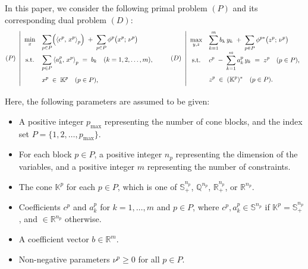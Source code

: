 \documentclass{scrartcl}
\newcommand{\inprod}[2]{\left\langle #1, \, #2 \right\rangle}
\begin{document}
In this paper, we consider the following primal problem \((P)\) and its corresponding dual problem \((D)\):
\begin{equation*}
    \everymath{\displaystyle}
    \renewcommand{\arraystretch}{2.0}
    (P)~
    \left|
    \begin{array}{cl}
         \min_{x} & \displaystyle 
             \sum_{p \in P} \Bigl(\inprod{c^p}{x^p}_p\Bigr) 
             \;+\;\sum_{p \in P} \phi^p\bigl(x^p;\,\nu^p\bigr) \\[3pt]
         \text{s.t.} 
         & \displaystyle 
             \sum_{p \in P} \inprod{a^p_{k}}{x^p}_p 
             \;=\; b_k \quad (k= 1,2,\ldots,m), \\[3pt]
         & x^p \;\in\; \mathbb{K}^p \quad (p\in P),
    \end{array}
    \right.
    \qquad
    (D)~
    \left|
    \begin{array}{cl}
         \max_{y,z} & \displaystyle 
            \sum_{k=1}^m b_k\, y_k 
            \;+\;\sum_{p \in P} \phi^{p*}\bigl(z^p;\,\nu^p\bigr) \\[3pt]
         \text{s.t.} 
         & \displaystyle 
            c^p \;-\; \sum_{k=1}^m a^p_k\,y_k \;=\; z^p \quad (p\in P), \\[3pt]
         & z^p \;\in\; (\mathbb{K}^p)^* \quad (p\in P).
    \end{array}
    \right.
\end{equation*}

Here, the following parameters are assumed to be given:
\begin{itemize}
    \item A positive integer $p_{\max}$ representing the number of cone blocks, and the index set $P = \{1, 2, \ldots, p_{\max}\}$.
    \item For each block $p \in P$, a positive integer $n_p$ representing the dimension of the variables, and a positive integer $m$ representing the number of constraints.
    \item The cone $\mathbb{K}^p$ for each $p \in P$, which is one of $\mathbb{S}^{n_p}_+$, $\mathbb{Q}^{n_p}$, $\mathbb{R}^{n_p}_+$, or $\mathbb{R}^{n_p}$.
    \item Coefficients $c^p$ and $a^p_k$ for $k = 1, \ldots, m$ and $p \in P$, where $c^p, a^p_k \in \mathbb{S}^{n_p}$ if $\mathbb{K}^p = \mathbb{S}^{n_p}_+$, and $\in \mathbb{R}^{n_p}$ otherwise.
    \item A coefficient vector $b \in \mathbb{R}^m$.
    \item Non-negative parameters $\nu^p \ge 0$ for all $p \in P$.
\end{itemize}
\end{document}
